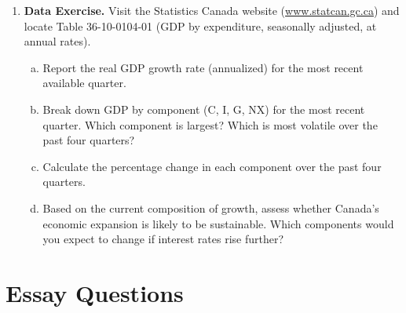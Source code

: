 \begin{enumerate}
\item \textbf{Data Exercise.} Visit the Statistics Canada website
(\url{www.statcan.gc.ca}) and locate Table 36-10-0104-01 (GDP by
expenditure, seasonally adjusted, at annual rates).
\begin{enumerate}[(a)]
  \item Report the real GDP growth rate (annualized) for the most recent
        available quarter.
  \item Break down GDP by component (C, I, G, NX) for the most recent quarter.
        Which component is largest? Which is most volatile over the past
        four quarters?
  \item Calculate the percentage change in each component over the past
        four quarters.
  \item Based on the current composition of growth, assess whether Canada's
        economic expansion is likely to be sustainable. Which components
        would you expect to change if interest rates rise further?
\end{enumerate}

\end{enumerate}

\section*{Essay Questions}

